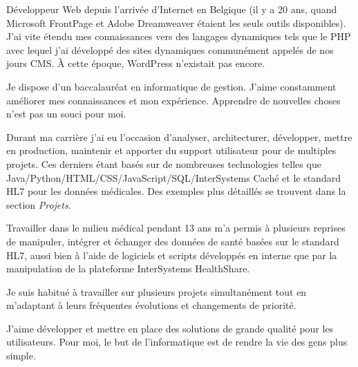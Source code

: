 

\begin{cvparagraph}

Développeur Web depuis l'arrivée d'Internet en Belgique (il y a 20 ans, quand Microsoft FrontPage et Adobe Dreamweaver étaient les seuls outils disponibles). J'ai vite étendu mes connaissances vers des langages dynamiques tels que le PHP avec lequel j'ai développé des sites dynamiques communément appelés de nos jours CMS. À cette époque, WordPress n'existait pas encore.

Je dispose d'un baccalauréat en informatique de gestion. J'aime constamment améliorer mes connaissances et mon expérience. Apprendre de nouvelles choses n'est pas un souci pour moi.

Durant ma carrière j'ai eu l'occasion  d'analyser, architecturer, développer, mettre en production, maintenir et apporter du support utilisateur pour de multiples projets. Ces derniers étant basés sur de nombreuses technologies telles que Java/Python/HTML/CSS/JavaScript/SQL/InterSystems Caché et le standard HL7 pour les données médicales. Des exemples plus détaillés se trouvent dans la section \emph{Projets}.


Travailler dans le milieu médical pendant 13 ans m'a permis à plusieurs reprises de manipuler, intégrer et échanger des données de santé basées sur le standard HL7, aussi bien à l'aide de logiciels et scripts développés en interne que par la manipulation de la plateforme InterSystems HealthShare.

Je suis habitué à travailler sur plusieurs projets simultanément tout en m'adaptant à leurs fréquentes évolutions et changements de priorité.


J'aime développer et mettre en place des solutions de grande qualité pour les utilisateurs.
Pour moi, le but de l'informatique est de rendre la vie des gens plus simple.
\end{cvparagraph}
